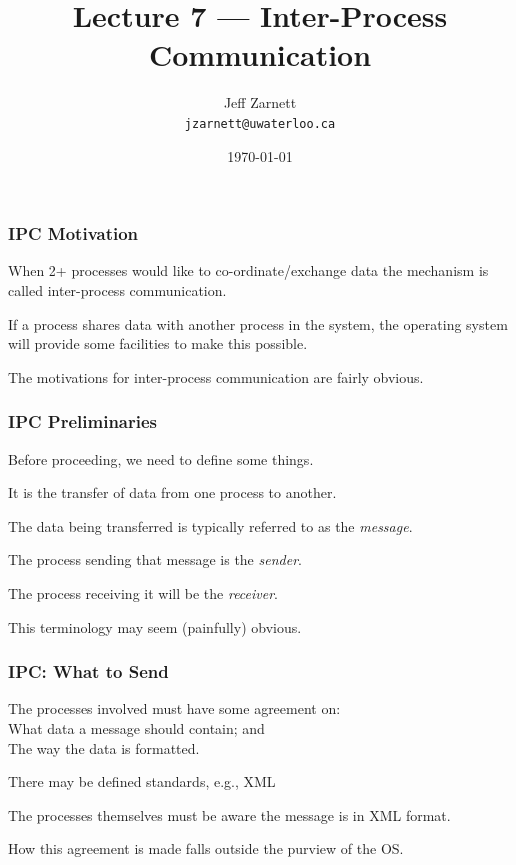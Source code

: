 

\title{Lecture 7 --- Inter-Process Communication}

\author{Jeff Zarnett \\ \small \texttt{jzarnett@uwaterloo.ca}}
\date{\today}




\begin{frame}
  \titlepage

 \end{frame}

\begin{frame}
\frametitle{IPC Motivation}

When 2+ processes would like to co-ordinate/exchange data the mechanism is called \alert{inter-process communication}.

If a process shares data with another process in the system, the operating system will provide some facilities to make this possible. 

The motivations for inter-process communication are fairly obvious.

\end{frame}


\begin{frame}
\frametitle{IPC Preliminaries}

Before proceeding, we need to define some things. 

It is the transfer of data from one process to another. 

The data being transferred is typically referred to as the \textit{message}. 

The process sending that message is the \textit{sender}.

The process receiving it will be the \textit{receiver}.

 This terminology may seem (painfully) obvious. 

\end{frame}


\begin{frame}
\frametitle{IPC: What to Send}

The processes involved must have some agreement on:\\
\quad What data a message should contain; and\\
\quad The way the data is formatted. 

There may be defined standards, e.g., XML

The processes themselves must be aware the message is in XML format. 

How this agreement is made falls outside the purview of the OS.

\end{frame}

